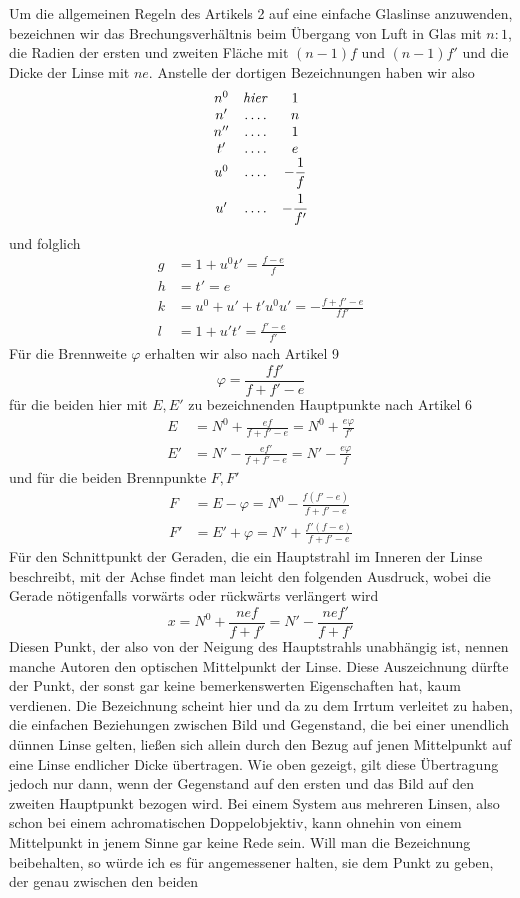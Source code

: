 Um die allgemeinen Regeln des Artikels 2 auf eine einfache Glaslinse anzuwenden, bezeichnen wir das Brechungsverhältnis beim Übergang von Luft in Glas mit $n:1$, die Radien der ersten und zweiten Fläche mit $(n-1)f$ und $(n-1)f'$ und die Dicke der Linse mit $ne$. Anstelle der dortigen Bezeichnungen haben wir also
\[
\begin{array}{ccc}
n^0&\mathit{hier}&1\\
n'&.\,.\,.\,.&n\\
n''&.\,.\,.\,.&1\\
t'&.\,.\,.\,.&e\\
u^0&.\,.\,.\,.&-\dfrac1f\\\noalign{\vskip 4pt}
u'&.\,.\,.\,.&-\dfrac1{f'}
\end{array}
\]
und folglich
\[
\begin{aligned}
g&=1+u^0t'=\frac{f-e}{f}\\
h&=t'=e\\
k&=u^0+u'+t'u^0u'=-\frac{f+f'-e}{ff'}\\
l&=1+u't'=\frac{f'-e}{f'}
\end{aligned}
\]
Für die Brennweite $\varphi$ erhalten wir also nach Artikel 9
\[
\varphi=\frac{ff'}{f+f'-e}
\]
für die beiden hier mit $E,E'$ zu bezeichnenden Hauptpunkte nach Artikel 6
\[
\begin{aligned}
E&=N^0+\frac{ef}{f+f'-e}=N^0+\frac{e\varphi}{f'}\\
E'&=N'-\frac{ef'}{f+f'-e}=N'-\frac{e\varphi}{f}
\end{aligned}
\]
und für die beiden Brennpunkte $F,F'$
\[
\begin{aligned}
F&=E-\varphi=N^0-\frac{f(f'-e)}{f+f'-e}\\
F'&=E'+\varphi=N'+\frac{f'(f-e)}{f+f'-e}
\end{aligned}
\]
Für den Schnittpunkt der Geraden, die ein Hauptstrahl im Inneren der Linse beschreibt, mit der Achse findet man leicht den folgenden Ausdruck, wobei die Gerade nötigenfalls vorwärts oder rückwärts verlängert wird
\[
x=N^0+\frac{nef}{f+f'}=N'-\frac{nef'}{f+f'}
\]
Diesen Punkt, der also von der Neigung des Hauptstrahls unabhängig ist, nennen manche Autoren den optischen Mittelpunkt der Linse. Diese Auszeichnung dürfte der Punkt, der sonst gar keine bemerkenswerten Eigenschaften hat, kaum verdienen. Die Bezeichnung scheint hier und da zu dem Irrtum verleitet zu haben, die einfachen Beziehungen zwischen Bild und Gegenstand, die bei einer unendlich dünnen Linse gelten, ließen sich allein durch den Bezug auf jenen Mittelpunkt auf eine Linse endlicher Dicke übertragen. Wie oben gezeigt, gilt diese Übertragung jedoch nur dann, wenn der Gegenstand auf den ersten und das Bild auf den zweiten Hauptpunkt bezogen wird. Bei einem System aus mehreren Linsen, also schon bei einem achromatischen Doppelobjektiv, kann ohnehin von einem Mittelpunkt in jenem Sinne gar keine Rede sein. Will man die Bezeichnung beibehalten, so würde ich es für angemessener halten, sie dem Punkt zu geben, der genau zwischen den beiden
